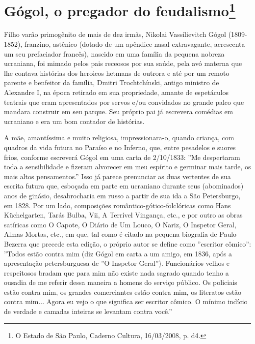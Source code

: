 \chapter{Gógol, o pregador do feudalismo\footnote{O Estado de São Paulo,
  Caderno Cultura, 16/03/2008, p. d4.}}

Filho varão primogênito de mais de dez irmãs, Nikolai Vassílievitch
Gógol (1809-1852), franzino, astênico (dotado de um apêndice nasal
extravagante, acrescenta um seu prefaciador francês), nascido em uma
família da pequena nobreza ucraniana, foi mimado pelos pais receosos por
sua saúde, pela avó materna que lhe contava histórias dos heroicos
hetmans de outrora e até por um remoto parente e benfeitor da família,
Dmitri Trochtchínski, antigo ministro de Alexandre I, na época retirado
em sua propriedade, amante de espetáculos teatrais que eram apresentados
por servos e/ou convidados no grande palco que mandara construir em seu
parque. Seu próprio pai já escrevera comédias em ucraniano e era um bom
contador de histórias.

A mãe, amantíssima e muito religiosa, impressionara-o, quando criança,
com quadros da vida futura no Paraíso e no Inferno, que, entre pesadelos
e suores frios, conforme escreverá Gógol em uma carta de 2/10/1833: ''Me
despertaram toda a sensibilidade e fizeram alvorecer em meu espírito e
germinar mais tarde, os mais altos pensamentos.'' Isso já parece
prenunciar as duas vertentes de sua escrita futura que, esboçada em
parte em ucraniano durante seus (abominados) anos de ginásio,
desabrocharia em russo a partir de sua ida a São Petersburgo, em 1828.
Por um lado, composições romântico-gótico-folclóricas como Hans
Küchelgarten, Tarás Bulba, Vii, A Terrível Vingança, etc., e por outro
as obras satíricas como O Capote, O Diário de Um Louco, O Nariz, O
Inspetor Geral, Almas Mortas, etc., em que, tal como é citado na pequena
biografia de Paulo Bezerra que precede esta edição, o próprio autor se
define como ''escritor cômico'': ''Todos estão contra mim (diz Gógol em
carta a um amigo, em 1836, após a apresentação petersburguesa de ''O
Inspetor Geral''). Funcionários velhos e respeitosos bradam que para mim
não existe nada sagrado quando tenho a ousadia de me referir dessa
maneira a homens do serviço público. Os policiais estão contra mim, os
grandes comerciantes estão contra mim, os literatos estão contra mim...
Agora eu vejo o que significa ser escritor cômico. O mínimo indício de
verdade e camadas inteiras se levantam contra você.''

